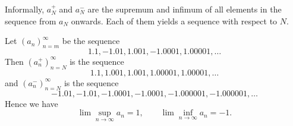 \begin{rem}
  Informally, $a_N^+$ and $a_N^-$ are the supremum and infimum
  of all elements in the sequence from $a_N$ onwards.
  Each of them yields a sequence with respect to $N$.
\end{rem}

\begin{exm}
  Let $(a_n)_{n=m}^{\infty}$ be the sequence
  \begin{displaymath}
    1.1, -1.01, 1.001, -1.0001, 1.00001, \ldots
  \end{displaymath}
  Then $(a_n^+)_{n=N}^{\infty}$ is the sequence
  \begin{displaymath}
    1.1, 1.001, 1.001, 1.00001, 1.00001, \ldots
  \end{displaymath}
  and $(a_n^-)_{n=N}^{\infty}$ is the sequence
  \begin{displaymath}
    -1.01, -1.01, -1.0001, -1.0001, -1.000001, -1.000001, \ldots
  \end{displaymath}
  Hence we have
  \begin{displaymath}
    \lim \sup_{n\rightarrow \infty} a_n = 1, \qquad
    \lim \inf_{n\rightarrow \infty} a_n = -1.
  \end{displaymath}
\end{exm}

